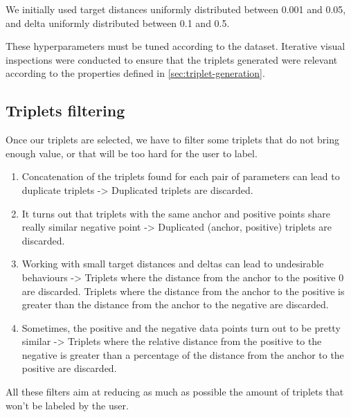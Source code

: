We initially used target distances uniformly distributed between 0.001 and 0.05, and delta uniformly distributed between 0.1 and 0.5.

These hyperparameters must be tuned according to the dataset. Iterative visual inspections were conducted to ensure that the triplets generated were relevant according to the properties defined in \autoref{sec:triplet-generation}.

\subsection{Triplets filtering}

Once our triplets are selected, we have to filter some triplets that do not bring enough value, or that will be too hard for the user to label.

\begin{enumerate}
    \item  Concatenation of the triplets found for each pair of parameters can lead to duplicate triplets -> Duplicated triplets are discarded.
    \item  It turns out that triplets with the same anchor and positive points share really similar negative point -> Duplicated (anchor, positive) triplets are discarded.
    \item Working with small target distances and deltas can lead to undesirable behaviours -> Triplets where the distance from the anchor to the positive $0$ are discarded. Triplets where the distance from the anchor to the positive is greater than the distance from the anchor to the negative are discarded.
    \item Sometimes, the positive and the negative data points turn out to be pretty similar -> Triplets where the relative distance from the positive to the negative is greater than a percentage of the distance from the anchor to the positive are discarded.
\end{enumerate}

All these filters aim at reducing as much as possible the amount of triplets that won't be labeled by the user.